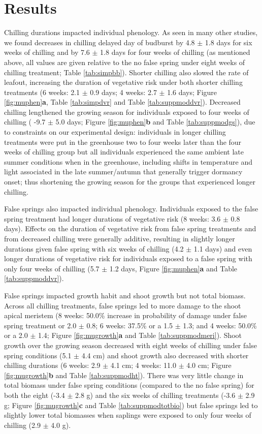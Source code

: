 \documentclass{article}\usepackage[]{graphicx}\usepackage[]{color}
\begin{document}
\section*{Results} 
Chilling durations impacted individual phenology. As seen in many other studies, we found decreases in chilling delayed day of budburst by 4.8 $\pm$ 1.8 days for six weeks of chilling and by 7.6 $\pm$ 1.8 days for four weeks of chilling (as mentioned above, all values are given relative to the no false spring under eight weeks of chilling treatment; Table \ref{tab:simpbb}). Shorter chilling also slowed the rate of leafout, increasing the duration of vegetative risk under both shorter chilling treatments (6 weeks: 2.1 $\pm$ 0.9 days; 4 weeks: 2.7 $\pm$ 1.6 days; Figure \ref{fig:muphen}\textbf{a}, Table \ref{tab:simpdvr} and Table \ref{tab:suppmoddvr}). Decreased chilling lengthened the growing season for individuals exposed to four weeks of chilling ( -9.7 $\pm$ 5.0 days; Figure \ref{fig:muphen}\textbf{b} and Table \ref{tab:suppmodgs}), due to constraints on our experimental design: individuals in longer chilling treatments were put in the greenhouse two to four weeks later than the four weeks of chilling group but all individuals experienced the same ambient late summer conditions when in the greenhouse, including shifts in temperature and light associated in the late summer/autumn that generally trigger dormancy onset; thus shortening the growing season for the groups that experienced longer chilling. 
 
False springs also impacted individual phenology. Individuals exposed to the false spring treatment had longer durations of vegetative risk (8 weeks: 3.6 $\pm$ 0.8 days). Effects on the duration of vegetative risk from false spring treatments and from decreased chilling were generally additive, resulting in slightly longer durations given false spring with six weeks of chilling (4.2 $\pm$ 1.1 days) and even longer durations of vegetative risk for individuals exposed to a false spring with only four weeks of chilling (5.7 $\pm$ 1.2 days, Figure \ref{fig:muphen}\textbf{a} and Table \ref{tab:suppmoddvr}).  

False springs impacted growth habit and shoot growth but not total biomass. Across all chilling treatments, false springs led to more damage to the shoot apical meristem (8 weeks: 50.0\% increase in probability of damage under false spring treatment or 2.0 $\pm$ 0.8; 6 weeks: 37.5\% or a 1.5 $\pm$ 1.3; and 4 weeks: 50.0\% or a 2.0 $\pm$ 1.4; Figure \ref{fig:mugrowth}\textbf{a} and Table \ref{tab:suppmodmeri}). Shoot growth over the growing season decreased with eight weeks of chilling under false spring conditions (5.1 $\pm$ 4.4 cm) and shoot growth also decreased with shorter chilling durations (6 weeks: 2.9 $\pm$ 4.1 cm; 4 weeks: 11.0 $\pm$ 4.0 cm; Figure \ref{fig:mugrowth}\textbf{b} and Table \ref{tab:suppmodht}). There was very little change in total biomass under false spring conditions (compared to the no false spring) for both the eight (-3.4 $\pm$ 2.8 g) and the six weeks of chilling treatments (-3.6 $\pm$ 2.9 g; Figure \ref{fig:mugrowth}\textbf{c} and Table \ref{tab:suppmodtotbio}) but false springs led to slightly lower total biomasses when saplings were exposed to only four weeks of chilling (2.9 $\pm$ 4.0 g).
  
\end{document}
